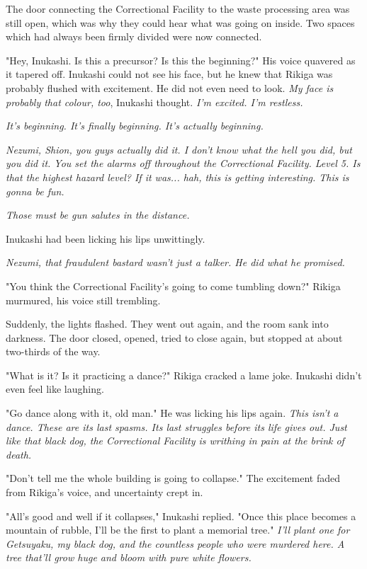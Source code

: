 The door connecting the Correctional Facility to the waste processing
area was still open, which was why they could hear what was going on
inside. Two spaces which had always been firmly divided were now
connected.

"Hey, Inukashi. Is this a precursor? Is this the beginning?" His voice
quavered as it tapered off. Inukashi could not see his face, but he knew
that Rikiga was probably flushed with excitement. He did not even need
to look. \emph{My face is probably that colour, too}, Inukashi thought. \emph{I'm
	excited. I'm restless.}

\emph{It's beginning. It's finally beginning. It's actually beginning.}

\emph{Nezumi, Shion, you guys actually did it. I don't know what the hell you
	did, but you did it. You set the alarms off throughout the Correctional
	Facility. Level 5. Is that the highest hazard level? If it was... hah,
	this is getting interesting. This is gonna be fun.}

\emph{Those must be gun salutes in the distance.}

Inukashi had been licking his lips unwittingly.

\emph{Nezumi, that fraudulent bastard wasn't just a talker. He did what he
	promised.}

"You think the Correctional Facility's going to come tumbling down?"
Rikiga murmured, his voice still trembling.

Suddenly, the lights flashed. They went out again, and the room sank
into darkness. The door closed, opened, tried to close again, but
stopped at about two-thirds of the way.

"What is it? Is it practicing a dance?" Rikiga cracked a lame joke.
Inukashi didn't even feel like laughing.

"Go dance along with it, old man." He was licking his lips again. \emph{This
	isn't a dance. These are its last spasms. Its last struggles before its
	life gives out. Just like that black dog, the Correctional Facility is
	writhing in pain at the brink of death.}

\mybreak

"Don't tell me the whole building is going to collapse." The excitement
faded from Rikiga's voice, and uncertainty crept in.

"All's good and well if it collapses," Inukashi replied. "Once this
place becomes a mountain of rubble, I'll be the first to plant a
memorial tree." \emph{I'll plant one for Getsuyaku, my black dog, and the
	countless people who were murdered here. A tree that'll grow huge and
	bloom with pure white flowers.}


